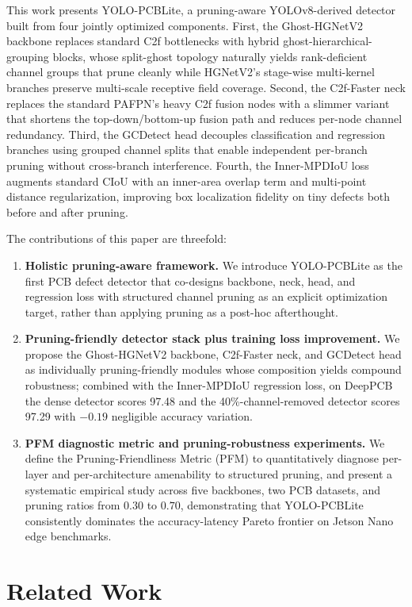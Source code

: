 \documentclass[conference]{IEEEtran}
\newcommand{\simulated}[1]{#1}
\begin{document}
This work presents YOLO-PCBLite, a pruning-aware YOLOv8-derived detector built from four jointly optimized components. First, the Ghost-HGNetV2 backbone replaces standard C2f bottlenecks with hybrid ghost-hierarchical-grouping blocks, whose split-ghost topology naturally yields rank-deficient channel groups that prune cleanly while HGNetV2's stage-wise multi-kernel branches preserve multi-scale receptive field coverage. Second, the C2f-Faster neck replaces the standard PAFPN's heavy C2f fusion nodes with a slimmer variant that shortens the top-down/bottom-up fusion path and reduces per-node channel redundancy. Third, the GCDetect head decouples classification and regression branches using grouped channel splits that enable independent per-branch pruning without cross-branch interference. Fourth, the Inner-MPDIoU loss augments standard CIoU with an inner-area overlap term and multi-point distance regularization, improving box localization fidelity on tiny defects both before and after pruning.

The contributions of this paper are threefold:
\begin{enumerate}
    \item \textbf{Holistic pruning-aware framework.} We introduce YOLO-PCBLite as the first PCB defect detector that co-designs backbone, neck, head, and regression loss with structured channel pruning as an explicit optimization target, rather than applying pruning as a post-hoc afterthought.
    \item \textbf{Pruning-friendly detector stack plus training loss improvement.} We propose the Ghost-HGNetV2 backbone, C2f-Faster neck, and GCDetect head as individually pruning-friendly modules whose composition yields compound robustness; combined with the Inner-MPDIoU regression loss, on DeepPCB the dense detector scores 97.48 and the 40\%-channel-removed detector scores 97.29 with $-0.19$ negligible accuracy variation.
    \item \textbf{PFM diagnostic metric and pruning-robustness experiments.} We define the Pruning-Friendliness Metric (PFM) to quantitatively diagnose per-layer and per-architecture amenability to structured pruning, and present a systematic empirical study across five backbones, two PCB datasets, and pruning ratios from $\simulated{0.30}$ to $\simulated{0.70}$, demonstrating that YOLO-PCBLite consistently dominates the accuracy-latency Pareto frontier on Jetson Nano edge benchmarks.
\end{enumerate}

\section{Related Work}
\label{sec:related}
\end{document}
